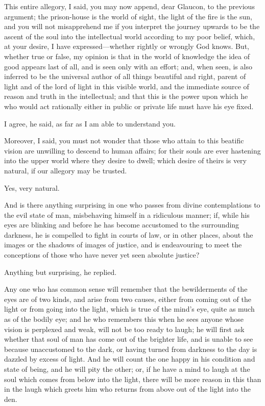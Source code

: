This entire allegory, I said, you may now append, dear Glaucon, to the
previous argument; the prison-house is the world of sight, the light
of the fire is the sun, and you will not misapprehend me if you
interpret the journey upwards to be the ascent of the soul into the
intellectual world according to my poor belief, which, at your desire,
I have ex\-pressed---whether rightly or wrongly God knows. But,
whether true or false, my opinion is that in the world of knowledge
the idea of good appears last of all, and is seen only with an effort;
and, when seen, is also inferred to be the universal author of all
things beautiful and right, parent of light and of the lord of light
in this visible world, and the immediate source of reason and truth in
the intellectual; and that this is the power upon which he who would
act rationally either in public or private life must have his eye
fixed.

I agree, he said, as far as I am able to understand you.

Moreover, I said, you must not wonder that those who attain to this
beatific vision are unwilling to descend to human affairs; for their
souls are ever hastening into the upper world where they desire to
dwell; which desire of theirs is very natural, if our allegory may be
trusted.

Yes, very natural.

And is there anything surprising in one who passes from divine
contemplations to the evil state of man, misbehaving himself in a
ridiculous manner; if, while his eyes are blinking and before he has
become accustomed to the surrounding darkness, he is compelled to
fight in courts of law, or in other places, about the images or the
shadows of images of justice, and is endeavouring to meet the
conceptions of those who have never yet seen absolute justice?

Anything but surprising, he replied.

Any one who has common sense will remember that the bewilderments of
the eyes are of two kinds, and arise from two causes, either from
coming out of the light or from going into the light, which is true of
the mind's eye, quite as much as of the bodily eye; and he who
remembers this when he sees anyone whose vision is perplexed and weak,
will not be too ready to laugh; he will first ask whether that soul of
man has come out of the brighter life, and is unable to see because
unaccustomed to the dark, or having turned from darkness to the day is
dazzled by excess of light. And he will count the one happy in his
condition and state of being, and he will pity the other; or, if he
have a mind to laugh at the soul which comes from below into the
light, there will be more reason in this than in the laugh which
greets him who returns from above out of the light into the den.

